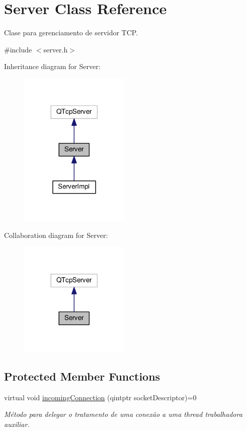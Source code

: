 \hypertarget{classServer}{}\section{Server Class Reference}
\label{classServer}


Clase para gerenciamento de servidor T\+CP.  




{\ttfamily \#include $<$server.\+h$>$}



Inheritance diagram for Server\+:\nopagebreak
\begin{figure}[H]
\begin{center}
\leavevmode
\includegraphics[width=149pt]{d3/dd7/classServer__inherit__graph}
\end{center}
\end{figure}


Collaboration diagram for Server\+:\nopagebreak
\begin{figure}[H]
\begin{center}
\leavevmode
\includegraphics[width=149pt]{de/ddc/classServer__coll__graph}
\end{center}
\end{figure}
\subsection*{Protected Member Functions}
\begin{DoxyCompactItemize}
\item 
virtual void \hyperlink{classServer_a2397527620515d7e18fc599b22fb64ae}{incoming\+Connection} (qintptr socket\+Descriptor)=0
\begin{DoxyCompactList}\small\item\em Método para delegar o tratamento de uma conexão a uma thread trabalhadora auxiliar. \end{DoxyCompactList}\end{DoxyCompactItemize}


